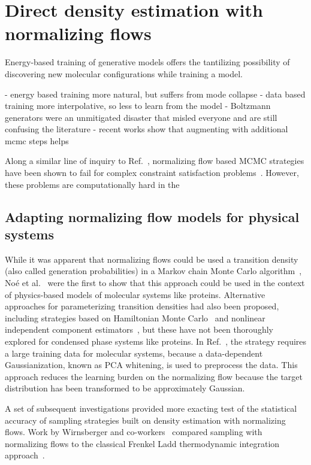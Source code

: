 \documentclass[11pt]{article}
\begin{document}
\section{Direct density estimation with normalizing flows}

Energy-based training of generative models offers the tantilizing possibility of discovering new molecular configurations while training a model. 

- energy based training more natural, but suffers from mode collapse
- data based training more interpolative, so less to learn from the model
- Boltzmann generators were an unmitigated disaster that misled everyone and are still confusing the literature
- recent works show that augmenting with additional mcmc steps helps

Along a similar line of inquiry to Ref.~\cite{ghio_sampling_2023}, normalizing flow based MCMC strategies have been shown to fail for complex constraint satisfaction problems~\cite{ciarella_machine-learning-assisted_2023}.
However, these problems are computationally hard in the

\subsection{Adapting normalizing flow models for physical systems}

While it was apparent that normalizing flows could be used a transition density (also called generation probabilities) in a Markov chain Monte Carlo algorithm~\cite{rezende_variational_2015}, No\'{e} et al.~\cite{noe_boltzmann_2019} were the first to show that this approach could be used in the context of physics-based models of molecular systems like proteins.
Alternative approaches for parameterizing transition densities had also been proposed, including strategies based on Hamiltonian Monte Carlo~\cite{levy_generalizing_2018} and nonlinear independent component estimators~\cite{song_-nice-mc_2017}, but these have not been thoroughly explored for condensed phase systems like proteins. 
In Ref.~\cite{noe_boltzmann_2019}, the strategy requires a large training data for molecular systems, because a data-dependent Gaussianization, known as PCA whitening, is used to preprocess the data. 
This approach reduces the learning burden on the normalizing flow because the target distribution has been transformed to be approximately Gaussian. 

A set of subsequent investigations provided more exacting test of the statistical accuracy of sampling strategies built on density estimation with normalizing flows. 
Work by Wirnsberger and co-workers~\cite{wirnsberger_normalizing_2021, wirnsberger_estimating_2023} compared sampling with normalizing flows to the classical Frenkel Ladd thermodynamic integration approach~\cite{frenkel_new_1984}.
\end{document}
